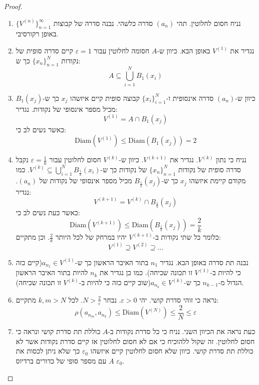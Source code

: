 \documentclass{tstextbook}
\begin{document}
\begin{proof}
  \begin{enumerate}
    \item נניח חסום לחלוטין. תהי \((a_{n})\) סדרה כלשהי. נבנה סדרה של קבוצות \(\{ V^{(n)} \}_{n=1}^{\infty}\) באופן רקורסיבי. 


    \item נגדיר את \(V^{(1)}\) באופן הבא. כיוון ש-\(A\) חסומה לחלוטין עבור \(\varepsilon=1\) קיים סדרה סופית של נקודות \(\{ x_{n} \}_{n=1}^{N}\) כך ש: 
$$A\subseteq \bigcup_{i=1}^{N}B_{1}(x_{i})$$


    \item כיוון ש-\((a_{n})\) סדרה אינסופית ו-\(\{ x_{i} \}_{i=1}^{N}\) קבוצה סופית קיים איזשהו \(x_{j}\) כך ש-\(B_{1}(x_{j})\) מכיל מספר אינסופי של נקודות. נגדיר: 
$$V^{(1)}=A\cap  B_{1}(x_{j})$$
כאשר נשים לב כי:
$$\mathrm{Diam}(V^{(1)})\leq \mathrm{Diam}(B_{1}(x_{j}))=2$$


    \item נניח כי נתון \(V^{(k)}\). נגדיר את \(V^{(k+1)}\). כיוון ש-\(V^{(k)}\) חסום לחלוטין עבור \(\varepsilon= \frac{1}{k}\) נקבל סדרה סופית של נקודות \(\{ x_{n} \}_{n=1}^{N}\) של נקודות כך ש-\(V^{(k)}\subseteq \bigcup_{i=1}^{N}B_{\frac{1}{k}}(x_{i})\). כמו מקודם קיימת איזשהו \(x_{j}\) כך ש-\(B_{\frac{1}{k}}(x_{j})\) מכיל מספר אינסופי של נקודות של \((a_{n})\). נגדיר: 
$$V^{(k+1)}=V^{(k)}\cap  B_{\frac{1}{k}}(x_{j})$$
כאשר כעת נשים לב כי:
$$\mathrm{Diam}(V^{(k+1)})\leq \mathrm{Diam}\left( B_{\frac{1}{k}}(x_{j}) \right)=\frac{2}{k}$$
כלומר כל שתי נקודות ב-\(V^{(k+1)}\) יהיו במרחק של לכל היותר \(\frac{2}{k}\). וכן מתקיים:
$$V^{(1)}\supseteq V^{(2)}\supseteq \dots$$


    \item נבנה תת סדרה באופן הבא. נגדיר \(n_{1}\) בתור האיבר הראשון כך ש-\(a_{n_{1}} \in V^{(1)}\)(קיים כזה כי להיות ב-\(V^{(1)}\) זו תכונה שכיחה). כמו כן נגדיר את \(n_{k}\) להיות בתור האיבר הראשון הגדול מ-\(n_{k-1}\) כך ש-\(a_{n_{k}}\in V^{(k)}\)(שוב קיים כזה כי להיות ב-\(V^{(k)}\) זו תכונה שכיחה).  


    \item נראה כי זוהי סדרת קושי. יהי \(\varepsilon> 0\). נבחר \(N>\frac{2}{\varepsilon}\). לכל \(k,m> N\) מתקיים: 
$$\rho(a_{n_{m}},a_{n_{k}})\leq  \mathrm{Diam}\left( V^{(N)} \right)\leq \frac{2}{N}\leq \varepsilon$$


    \item כעת נראה את הכיוון השני. נניח כי כל סדרת נקודות ב-\(A\) כוללת תת סדרת קושי ונראה כי חסום לחלוטין. זה שקול ללהוכיח כי אם לא חסום לחלוטין אז קיים סדרת נקודות אשר לא כוללת תת סדרת קושי. כיוון שלא חסום לחלוטין קיים איזשהו \(\varepsilon_{0}\) כך שלא ניתן לכסות את \(A\) עם מספר סופי של כדורים ברדיוס \(\varepsilon_{0}\). 



\end{enumerate}
\end{proof}
\end{document}
